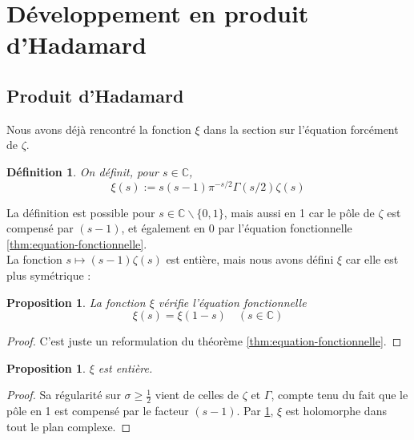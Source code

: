 \documentclass[french]{report}
\newtheorem{definition}[theorem]{Définition}
\newtheorem{proposition}[theorem]{Proposition}
\begin{document}
\section{Développement en produit d'Hadamard}

\subsection{Produit d'Hadamard}

Nous avons déjà rencontré la fonction $\xi$ dans la section sur l'équation forcément de $\zeta$.

\begin{definition}
  On définit, pour $s\in\mathbb{C}$,
  \[ \xi(s) := s(s-1)\pi^{-s/2}\Gamma(s/2)\zeta(s) \]
\end{definition}

La définition est possible pour $s\in\mathbb{C}\backslash\{0,1\}$, mais aussi en 1 car le pôle de $\zeta$ est compensé par $(s-1)$, et également en 0 par l'équation fonctionnelle \ref{thm:equation-fonctionnelle}.
\\

La fonction $s\mapsto(s-1)\zeta(s)$ est entière, mais nous avons défini $\xi$ car elle est plus symétrique :

\begin{proposition}\label{prop:xi-equation-fonctionnelle}
  La fonction $\xi$ vérifie l'équation fonctionnelle
  \[ \xi(s) = \xi(1-s)\quad (s\in\mathbb{C}) \]
\end{proposition}

\begin{proof}
  C'est juste un reformulation du théorème \ref{thm:equation-fonctionnelle}.
\end{proof}

\begin{proposition}
  $\xi$ est entière.
\end{proposition}

\begin{proof}
  Sa régularité sur $\sigma\geq\frac{1}{2}$ vient de celles de $\zeta$ et $\Gamma$, compte tenu du fait que le pôle en 1 est compensé par le facteur $(s-1)$. Par \ref{prop:xi-equation-fonctionnelle}, $\xi$ est holomorphe dans tout le plan complexe.
\end{proof}
\end{document}
